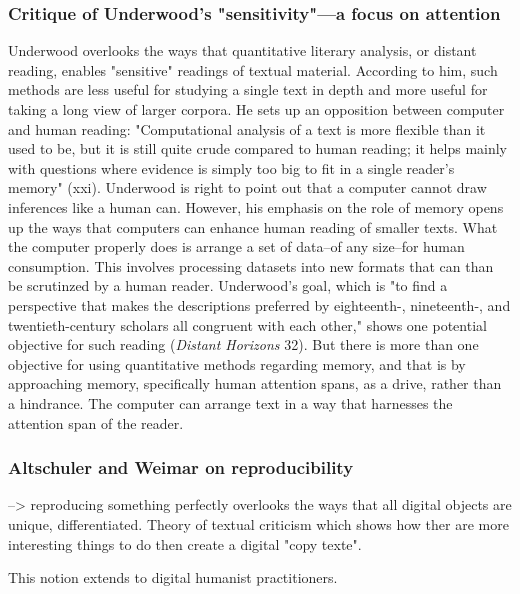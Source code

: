 \documentclass[11pt]{article}
\begin{document}
\subsubsection{Critique of Underwood's "sensitivity"---a focus on attention}
\label{sec:org716c16a}
Underwood overlooks the ways that quantitative literary analysis, or
distant reading, enables "sensitive" readings of textual
material. According to him, such methods are less useful for studying
a single text in depth and more useful for taking a long view of
larger corpora. He sets up an opposition between computer and human
reading: "Computational analysis of a text is more flexible than it
used to be, but it is still quite crude compared to human reading; it
helps mainly with questions where evidence is simply too big to fit in
a single reader's memory" (xxi). Underwood is right to point out that
a computer cannot draw inferences like a human can. However, his
emphasis on the role of memory opens up the ways that computers can
enhance human reading of smaller texts. What the computer properly
does is arrange a set of data--of any size--for human
consumption. This involves processing datasets into new formats that
can than be scrutinzed by a human reader. Underwood's goal, which is
"to find a perspective that makes the descriptions preferred by
eighteenth-, nineteenth-, and twentieth-century scholars all congruent
with each other," shows one potential objective for such reading
(\emph{Distant Horizons} 32). But there is more than one objective for
using quantitative methods regarding memory, and that is by
approaching memory, specifically human attention spans, as a drive,
rather than a hindrance. The computer can arrange text in a way that
harnesses the attention span of the reader.

\subsubsection{Altschuler and Weimar on reproducibility}
\label{sec:org15e1b62}

--> reproducing something perfectly overlooks the ways that all
digital objects are unique, differentiated. Theory of textual
criticism which shows how ther are more interesting things to do then
create a digital "copy texte". 

This notion extends to digital humanist practitioners. 
\end{document}
